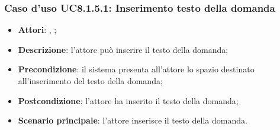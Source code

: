 	\subsubsection{Caso d'uso UC8.1.5.1: Inserimento testo della domanda}
	\begin{itemize}
		\item
		\textbf{Attori}: \uau, \uaupro;
		\item		
		\textbf{Descrizione}: l'attore può inserire il testo della domanda;
		\item
		\textbf{Precondizione}: il sistema presenta all'attore lo spazio destinato all'inserimento del testo della domanda;
		\item \textbf{Postcondizione}: l'attore ha inserito il testo della domanda;
		\item \textbf{Scenario principale}: l'attore inserisce il testo della domanda. 
	\end{itemize}

